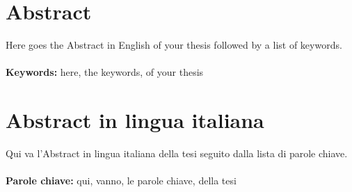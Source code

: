 \documentclass{Configuration_Files/PoliMi3i_thesis}
\begin{document}


\pagestyle{empty} %
\frontmatter %


\startpreamble
\setcounter{page}{1} %

\chapter*{Abstract} 
Here goes the Abstract in English of your thesis followed by a list of keywords.
\\
\\
\textbf{Keywords:} here, the keywords, of your thesis %

\chapter*{Abstract in lingua italiana}
Qui va l'Abstract in lingua italiana della tesi seguito dalla lista di parole chiave.
\\
\\
\textbf{Parole chiave:} qui, vanno, le parole chiave, della tesi %

\end{document}

